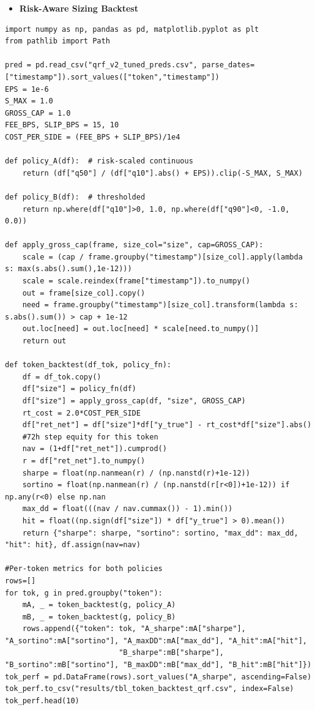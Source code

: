 \documentclass[
  a4paper,
  DIV=11,
  numbers=noendperiod]{scrreprt}
\providecommand{\tightlist}{%
  \setlength{\itemsep}{0pt}\setlength{\parskip}{0pt}}
\begin{document}
\begin{itemize}
\tightlist
\item
  \textbf{Risk-Aware Sizing Backtest}
\end{itemize}

\begin{verbatim}
import numpy as np, pandas as pd, matplotlib.pyplot as plt
from pathlib import Path

pred = pd.read_csv("qrf_v2_tuned_preds.csv", parse_dates=["timestamp"]).sort_values(["token","timestamp"])
EPS = 1e-6
S_MAX = 1.0
GROSS_CAP = 1.0
FEE_BPS, SLIP_BPS = 15, 10
COST_PER_SIDE = (FEE_BPS + SLIP_BPS)/1e4

def policy_A(df):  # risk-scaled continuous
    return (df["q50"] / (df["q10"].abs() + EPS)).clip(-S_MAX, S_MAX)

def policy_B(df):  # thresholded
    return np.where(df["q10"]>0, 1.0, np.where(df["q90"]<0, -1.0, 0.0))

def apply_gross_cap(frame, size_col="size", cap=GROSS_CAP):
    scale = (cap / frame.groupby("timestamp")[size_col].apply(lambda s: max(s.abs().sum(),1e-12)))
    scale = scale.reindex(frame["timestamp"]).to_numpy()
    out = frame[size_col].copy()
    need = frame.groupby("timestamp")[size_col].transform(lambda s: s.abs().sum()) > cap + 1e-12
    out.loc[need] = out.loc[need] * scale[need.to_numpy()]
    return out

def token_backtest(df_tok, policy_fn):
    df = df_tok.copy()
    df["size"] = policy_fn(df)
    df["size"] = apply_gross_cap(df, "size", GROSS_CAP)
    rt_cost = 2.0*COST_PER_SIDE
    df["ret_net"] = df["size"]*df["y_true"] - rt_cost*df["size"].abs()
    #72h step equity for this token
    nav = (1+df["ret_net"]).cumprod()
    r = df["ret_net"].to_numpy()
    sharpe = float(np.nanmean(r) / (np.nanstd(r)+1e-12))
    sortino = float(np.nanmean(r) / (np.nanstd(r[r<0])+1e-12)) if np.any(r<0) else np.nan
    max_dd = float(((nav / nav.cummax()) - 1).min())
    hit = float((np.sign(df["size"]) * df["y_true"] > 0).mean())
    return {"sharpe": sharpe, "sortino": sortino, "max_dd": max_dd, "hit": hit}, df.assign(nav=nav)

#Per-token metrics for both policies
rows=[]
for tok, g in pred.groupby("token"):
    mA, _ = token_backtest(g, policy_A)
    mB, _ = token_backtest(g, policy_B)
    rows.append({"token": tok, "A_sharpe":mA["sharpe"], "A_sortino":mA["sortino"], "A_maxDD":mA["max_dd"], "A_hit":mA["hit"],
                          "B_sharpe":mB["sharpe"], "B_sortino":mB["sortino"], "B_maxDD":mB["max_dd"], "B_hit":mB["hit"]})
tok_perf = pd.DataFrame(rows).sort_values("A_sharpe", ascending=False)
tok_perf.to_csv("results/tbl_token_backtest_qrf.csv", index=False)
tok_perf.head(10)
\end{verbatim}
\end{document}
